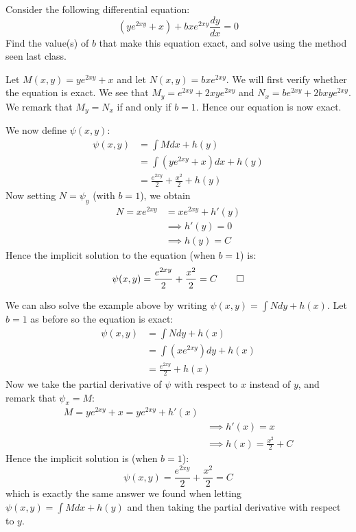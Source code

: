 \begin{example}
   Consider the following differential equation:
   \[ (ye^{2xy} + x) + bxe^{2xy}\frac{dy}{dx} = 0 \]
   Find the value(s) of $b$ that make this equation exact, and solve using the method seen last class.
\end{example}
\begin{solution}
   Let $M(x,y) = ye^{2xy} + x$ and let $N(x,y) = bxe^{2xy}$. We will first verify whether the equation is exact. We see that $M_y = e^{2xy} + 2xye^{2xy}$ and $N_x = be^{2xy} + 2bxye^{2xy}$. We remark that $M_y = N_x$ if and only if $b = 1$. Hence our equation is now exact. 

   We now define $\psi(x,y)$:
   \begin{align*}
      \psi(x,y) &= \int M dx + h(y) \\
                &= \int (ye^{2xy} + x)dx + h(y) \\
                &= \frac{e^{2xy}}{2} + \frac{x^2}{2} + h(y)
   \end{align*}
   Now setting $N = \psi_y$ (with $b = 1$), we obtain
   \begin{align*}
      N = xe^{2xy} &= xe^{2xy} + h'(y) \\
                   &\implies h'(y) = 0 \\
                   &\implies h(y) = C
   \end{align*}
   Hence the implicit solution to the equation (when $b = 1$) is:
   \[ \psi(x,y) = \frac{e^{2xy}}{2} + \frac{x^2}{2} = C \qedhere \]
\end{solution}
\begin{remark}
   We can also solve the example above by writing $\psi(x,y) = \int N dy + h(x)$. Let $b = 1$ as before so the equation is exact:
   \begin{align*}
      \psi(x,y) &= \int N dy + h(x) \\
               &= \int (xe^{2xy}) dy + h(x) \\
                &= \frac{e^{2xy}}{2} + h(x)
   \end{align*}
   Now we take the partial derivative of $\psi$ with respect to $x$ instead of $y$, and remark that $\psi_x = M$:
    \begin{align*}
       M = ye^{2xy} + x = ye^{2xy} + h'(x) \\
                   &\implies h'(x) = x \\
                   &\implies h(x) = \frac{x^2}{2} + C
   \end{align*}
   Hence the implicit solution is (when $b = 1$):
   \[ \psi(x,y) = \frac{e^{2xy}}{2} + \frac{x^2}{2} = C \]
   which is exactly the same answer we found when letting $\psi(x,y) = \int M dx + h(y)$ and then taking the partial derivative with respect to $y$.
\end{remark}

